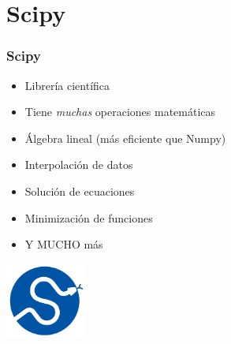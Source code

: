 \documentclass[14pt,aspectratio=169,xcolor=dvipsnames]{beamer}
\begin{document}
\section{Scipy}
\begin{frame}\frametitle{Scipy}
    \begin{itemize}
        \item Librería científica
        \item Tiene \emph{muchas} operaciones matemáticas
        \item Álgebra lineal (más eficiente que Numpy)
        \item {\only<2>{\bf}Interpolación de datos}
        \item {Solución de ecuaciones}
        \item {Minimización de funciones}
        \item Y MUCHO más
    \end{itemize}

    \begin{flushright}
        \includegraphics[width=0.2\textwidth]{../images/logos/scipy.png}
    \end{flushright}
\end{frame}
\end{document}
